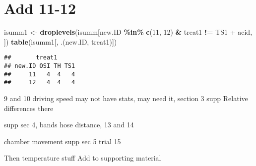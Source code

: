 \documentclass[
]{article}
\newenvironment{Shaded}{\begin{snugshade}}{\end{snugshade}}
\newcommand{\FunctionTok}[1]{\textcolor[rgb]{0.13,0.29,0.53}{\textbf{#1}}}
\newcommand{\NormalTok}[1]{#1}
\newcommand{\OtherTok}[1]{\textcolor[rgb]{0.56,0.35,0.01}{#1}}
\newcommand{\SpecialCharTok}[1]{\textcolor[rgb]{0.81,0.36,0.00}{\textbf{#1}}}
\newcommand{\StringTok}[1]{\textcolor[rgb]{0.31,0.60,0.02}{#1}}
\begin{document}
\section{Add 11-12}\label{add-11-12}

\begin{Shaded}
\begin{Highlighting}[]
\NormalTok{isumm1 }\OtherTok{\textless{}{-}} \FunctionTok{droplevels}\NormalTok{(isumm[new.ID }\SpecialCharTok{\%in\%} \FunctionTok{c}\NormalTok{(}\StringTok{\textquotesingle{}11\textquotesingle{}}\NormalTok{, }\StringTok{\textquotesingle{}12\textquotesingle{}}\NormalTok{) }\SpecialCharTok{\&}\NormalTok{ treat1 }\SpecialCharTok{!=} \StringTok{\textquotesingle{}TS1 + acid\textquotesingle{}}\NormalTok{, ])}
\FunctionTok{table}\NormalTok{(isumm1[, .(new.ID, treat1)])}
\end{Highlighting}
\end{Shaded}

\begin{verbatim}
##       treat1
## new.ID OSI TH TS1
##     11   4  4   4
##     12   4  4   4
\end{verbatim}

9 and 10 driving speed may not have stats, may need it, section 3 supp
Relative differences there

supp sec 4, bands hose distance, 13 and 14

chamber movement supp sec 5 trial 15

Then temperature stuff Add to supporting material
\end{document}
